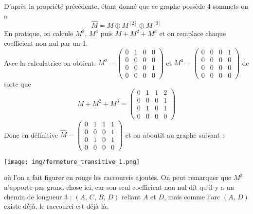 \documentclass[a4paper,12pt]{book}
\begin{document}
\begin{methode}

D'après la propriété précédente, étant donné que ce graphe possède 4 sommets on a $$\widehat{M}=M\oplus M^{[2]}\oplus M^{[3]}$$
En pratique, on calcule $M^2$, $M^3$ puis $M+M^2+M^3$ et on remplace chaque coefficient non nul par un 1.\\
Avec la calculatrice on obtient:
$M^2=\begin{pmatrix}0&1&0&0\\0&0&0&0\\0&0&0&1\\0&0&0&0\end{pmatrix}$ et 
$M^3=\begin{pmatrix}0&0&0&1\\0&0&0&0\\0&0&0&0\\0&0&0&0\end{pmatrix}$ de sorte que
$$M+M^2+M^3=\begin{pmatrix}0&1&1&2\\0&0&0&1\\0&1&0&1\\0&0&0&0\end{pmatrix}$$
Donc en définitive $\widehat{M}=\begin{pmatrix}0&1&1&1\\0&0&0&1\\0&1&0&1\\0&0&0&0\end{pmatrix}$
et on aboutit au graphe suivant :
\begin{center}
\texttt{[image: img/fermeture\_transitive\_1.png]}
\end{center}
où l'on a fait figurer en rouge les \og raccourcis\fg{} ajoutés. On peut remarquer que $M^3$ n'apporte pas grand-chose ici, car son seul coefficient non nul dit qu'il y a un chemin de longueur 3 : $(A,\,C,\,B,\,D)$ reliant $A$ et $D$, mais comme l'arc $(A,\,D)$ existe déjà, \og le raccourci est déjà là\fg{}.



\end{methode}
\end{document}
